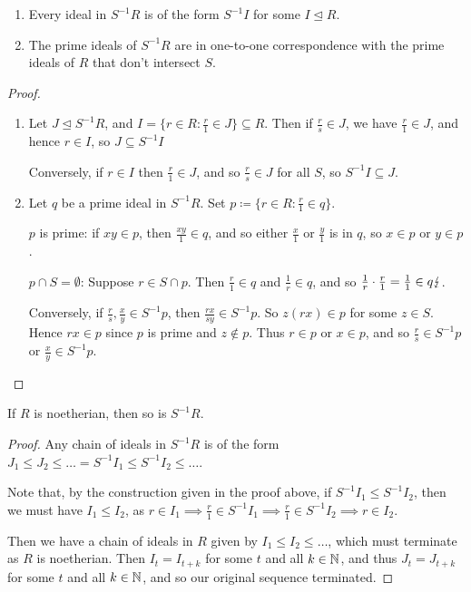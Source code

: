 \documentclass[10pt,a4paper]{article}
\begin{document}
\begin{lemma}\hspace*{0cm}
  \begin{enumerate}
    \item Every ideal in $S^{-1}R$ is of the form $S^{-1}I$ for some $I \trianglelefteq R$.
    \item The prime ideals of $S^{-1}R$ are in one-to-one correspondence with the prime ideals of $R$ that don't intersect $S$.
  \end{enumerate}
\end{lemma}
\begin{proof}\hspace*{0cm}
  \begin{enumerate}[label=\textit{\arabic*.}]
    \item Let $J\trianglelefteq S^{-1}R$, and $I = \{r \in R:\frac{r}{1}\in J\}\subseteq R$. Then if $\frac{r}{s} \in J$, we have $\frac{r}{1} \in J$, and hence $r \in I$, so $J \subseteq S^{-1}I$

    Conversely, if $r \in I$ then $\frac{r}{1}\in J$, and so $\frac{r}{s}\in J$ for all $S$, so $S^{-1}I \subseteq J$.

    \item Let $q$ be a prime ideal in $S^{-1}R$. Set $p \coloneqq \{r\in R : \frac{r}{1}\in q\}$.

    $p$ is prime: if $xy \in p$, then $\frac{xy}{1}\in q$, and so either $\frac{x}{1}$ or $\frac{y}{1}$ is in $q$, so $x \in p$ or $y \in p$.

    $p\cap S =\emptyset$: Suppose $r \in S \cap p$. Then $\frac{r}{1} \in q$ and $\frac{1}{r} \in q$, and so $\frac{1}{r}\cdot \frac{r}{1} = \frac{1}{1}\in q \lightning$.

    Conversely, if $\frac{r}{s}, \frac{x}{y} \in S^{-1}p$, then $\frac{rx}{sy} \in S^{-1}p$. So $z(rx)\in p$ for some $z\in S$. Hence $rx \in p$ since $p$ is prime and $z \notin p$. Thus $r \in p$ or $x \in p$, and so $\frac{r}{s} \in S^{-1}p$ or $\frac{x}{y} \in S^{-1}p$.
  \end{enumerate}
\end{proof}
\begin{lemma}
  If $R$ is noetherian, then so is $S^{-1}R$.
\end{lemma}
\begin{proof}
  Any chain of ideals in $S^{-1}R$ is of the form $J_1 \leq J_2 \leq \ldots = S^{-1}I_1 \leq S^{-1}I_2 \leq \ldots$.

  Note that, by the construction given in the proof above, if $S^{-1}I_1 \leq S^{-1}I_2$, then we must have $I_1 \leq I_2$, as $r \in I_1\implies\frac{r}{1} \in S^{-1}I_1 \implies \frac{r}{1} \in S^{-1}I_2 \implies r \in I_2$.

  Then we have a chain of ideals in $R$ given by $I_1 \leq I_2 \leq \ldots$, which must terminate as $R$ is noetherian. Then $I_t = I_{t+k}$ for some $t$ and all $k \in \mathbb{N}$, and thus $J_t = J_{t+k}$ for some $t$ and all $k \in \mathbb{N}$, and so our original sequence terminated.
\end{proof}
\end{document}
